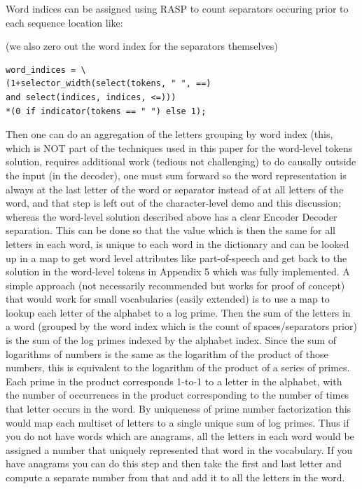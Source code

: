 \documentclass[11pt]{article}
\begin{document}
Word indices can be assigned using RASP to count separators occuring prior to each sequence location like:

(we also zero out the word index for the separators themselves)

\begin{tiny}
\begin{verbatim}
word_indices = \
(1+selector_width(select(tokens, " ", ==) 
and select(indices, indices, <=)))
*(0 if indicator(tokens == " ") else 1);
\end{verbatim}
\end{tiny}

Then one can do an aggregation of the letters grouping by word index (this, which is NOT part of the techniques used in this paper for the word-level tokens solution, requires additional work (tedious not challenging) to do causally outside the input (in the decoder), one must sum forward so the word representation is always at the last letter of the word or separator instead of at all letters of the word, and that step is left out of the character-level demo and this discussion; whereas the word-level solution described above has a clear Encoder Decoder separation. This can be done so that the value which is then the same for all letters in each word, is unique to each word in the dictionary and can be looked up in a map to get word level attributes like part-of-speech and get back to the solution in the word-level tokens in Appendix 5 which was fully implemented. A simple approach (not necessarily recommended but works for proof of concept) that would work for small vocabularies (easily extended) is to use a map to lookup each letter of the alphabet to a log prime. Then the sum of the letters in a word (grouped by the word index which is the count of spaces/separators prior) is the sum of the log primes indexed by the alphabet index. Since the sum of logarithms of numbers is the same as the logarithm of the product of those numbers, this is equivalent to the logarithm of the product of a series of primes. Each prime in the product corresponds 1-to-1 to a letter in the alphabet, with the number of occurrences in the product corresponding to the number of times that letter occurs in the word. By uniqueness of prime number factorization this would map each multiset of letters to a single unique sum of log primes. Thus if you do not have words which are anagrams, all the letters in each word would be assigned a number that uniquely represented that word in the vocabulary. If you have anagrams you can do this step and then take the first and last letter and compute a separate number from that and add it to all the letters in the word.
\end{document}
